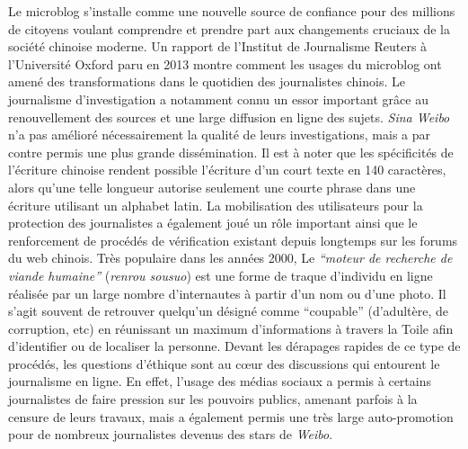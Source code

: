 Le microblog s’installe comme une nouvelle source de confiance pour des millions de citoyens voulant comprendre et prendre part aux changements cruciaux de la société chinoise moderne. Un rapport de l’Institut de Journalisme Reuters à l’Université Oxford paru en 2013 montre comment les usages du microblog ont amené des transformations dans le quotidien des journalistes chinois. Le journalisme d’investigation a notamment connu un essor important grâce au renouvellement des sources et une large diffusion en ligne des sujets. \textit{Sina Weibo} n’a pas amélioré nécessairement la qualité de leurs investigations, mais a par contre permis une plus grande dissémination. Il est à noter que les spécificités de l’écriture chinoise rendent possible l’écriture d’un court texte en 140 caractères, alors qu’une telle longueur autorise seulement une courte phrase dans une écriture utilisant un alphabet latin. La mobilisation des utilisateurs pour la protection des journalistes a également joué un rôle important ainsi que le renforcement de procédés de vérification existant depuis longtemps sur les forums du web chinois. Très populaire dans les années 2000, Le \textit{``moteur de recherche de viande humaine''} (\textit{renrou sousuo}) est une forme de traque d’individu en ligne réalisée par un large nombre d’internautes à partir d’un nom ou d’une photo. Il s’agit souvent de retrouver quelqu’un désigné comme ``coupable'' (d’adultère, de corruption, etc) en réunissant un maximum d’informations à travers la Toile afin d’identifier ou de localiser la personne. Devant les dérapages rapides de ce type de procédés, les questions d’éthique sont au cœur des discussions qui entourent le journalisme en ligne. En effet, l’usage des médias sociaux a permis à certains journalistes de faire pression sur les pouvoirs publics, amenant parfois à la censure de leurs travaux, mais a également permis une très large auto-promotion pour de nombreux journalistes devenus des stars de \textit{Weibo}.

